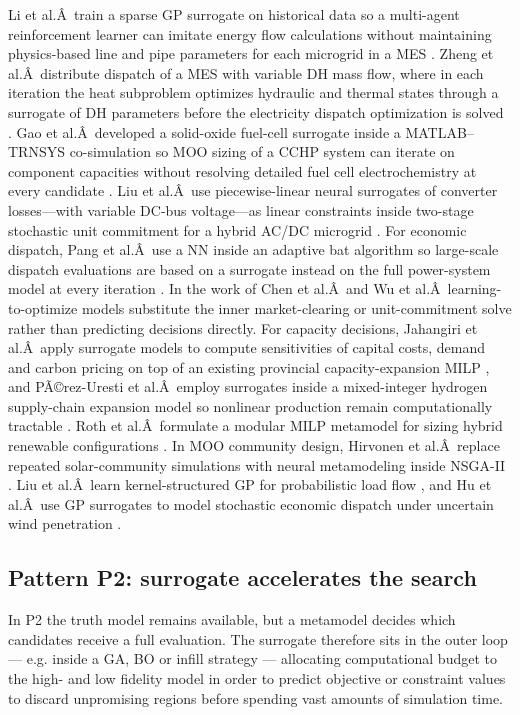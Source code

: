 \documentclass[final,5p,times,twocolumn]{elsarticle}
\begin{document}
Li et al.Â~train a sparse GP surrogate on historical data so a
multi-agent reinforcement learner can imitate energy flow calculations
without maintaining physics-based line and pipe parameters for each
microgrid in a MES \cite{Li2023__3}. Zheng et al.Â~distribute dispatch of a
MES with variable DH mass flow, where in each iteration the heat
subproblem optimizes hydraulic and thermal states through a surrogate of
DH parameters before the electricity dispatch optimization is solved
\cite{Zheng20231907}. Gao et al.Â~developed a solid-oxide fuel-cell surrogate
inside a MATLAB--TRNSYS co-simulation so MOO sizing of a CCHP system can
iterate on component capacities without resolving detailed fuel cell
electrochemistry at every candidate \cite{Gao2025}. Liu et al.Â~use
piecewise-linear neural surrogates of converter losses---with variable
DC-bus voltage---as linear constraints inside two-stage stochastic unit
commitment for a hybrid AC/DC microgrid \cite{Liu20242534}. For economic
dispatch, Pang et al.Â~use a NN inside an adaptive bat algorithm so
large-scale dispatch evaluations are based on a surrogate instead on the
full power-system model at every iteration \cite{Pang2023}. In the work of
Chen et al.Â~and Wu et al.Â~learning-to-optimize models substitute the
inner market-clearing or unit-commitment solve rather than predicting
decisions directly. For capacity decisions, Jahangiri et al.Â~apply
surrogate models to compute sensitivities of capital costs, demand and
carbon pricing on top of an existing provincial capacity-expansion MILP
\cite{Jahangiri20244849}, and PÃ©rez-Uresti et al.Â~employ surrogates inside a
mixed-integer hydrogen supply-chain expansion model so nonlinear
production remain computationally tractable \cite{Pérez-Uresti2023}. Roth et
al.Â~formulate a modular MILP metamodel for sizing hybrid renewable
configurations \cite{Roth2019214}. In MOO community design, Hirvonen et
al.Â~replace repeated solar-community simulations with neural
metamodeling inside NSGA-II \cite{Hirvonen2017323}. Liu et al.Â~learn
kernel-structured GP for probabilistic load flow \cite{Liu20222679}, and Hu
et al.Â~use GP surrogates to model stochastic economic dispatch under
uncertain wind penetration \cite{Hu2020}.

\subsection{Pattern P2: surrogate accelerates the search}
\label{sec:int:accelerate}

In P2 the truth model remains available, but a metamodel decides which
candidates receive a full evaluation. The surrogate therefore sits in
the outer loop --- e.g. inside a GA, BO or infill strategy ---
allocating computational budget to the high- and low fidelity model in
order to predict objective or constraint values to discard unpromising
regions before spending vast amounts of simulation time.
\end{document}
